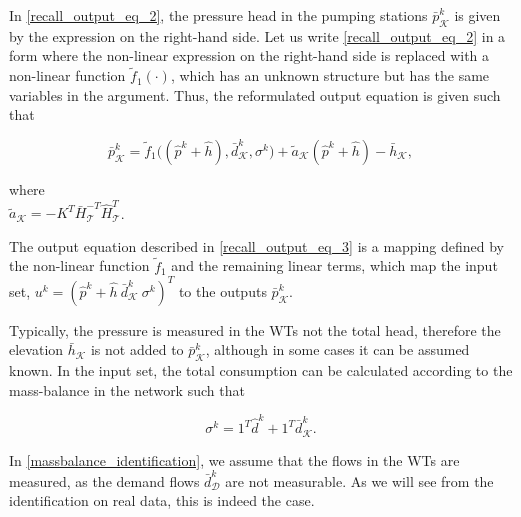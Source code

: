 \vspace{-4mm}
In \eqref{recall_output_eq_2}, the pressure head in the pumping stations $\bar{p}^{k}_{\mathcal{K}}$ is given by the expression on the right-hand side. Let us write \eqref{recall_output_eq_2} in a form where the non-linear expression on the right-hand side is replaced with a non-linear function $\tilde{f}_1(\cdot)$, which has an unknown structure but has the same variables in the argument. Thus, the reformulated output equation is given such that 

 \begin{equation}
  \label{recall_output_eq_3}
     \bar{p}^{k}_{\mathcal{K}}  = \tilde{f}_1 \big((\hat{p}^{k} + \hat{h}),\bar{d}^{k}_{\mathcal{K}}, \sigma^{k}\big) + \tilde{a}_{\mathcal{K}} (\hat{p}^{k} + \hat{h}) - \bar{h}_{\mathcal{K}}, 
\end{equation} 

\vspace{-1mm}

\begin{minipage}[t]{0.4\textwidth}
where\\
\hspace*{8mm} $\tilde{a}_{\mathcal{K}} = - K^T\bar{H}^{-T}_{\mathcal{T}}\hat{H}^{T}_{\mathcal{T}} $. 
\end{minipage}

The output equation described in \eqref{recall_output_eq_3} is a mapping defined by the non-linear function $\tilde{f}_1$ and the remaining linear terms, which map the input set, $u^{k} = ( \hat{p}^{k}\!+\!\hat{h} \ \bar{d}^{k}_{\mathcal{K}} \ \sigma^{k} )^T$ to the outputs $\bar{p}^{k}_{\mathcal{K}}$. 

Typically, the pressure is measured in the WTs not the total head, therefore the elevation $\bar{h}_{\mathcal{K}}$ is not added to $\bar{p}^{k}_{\mathcal{K}}$, although in some cases it can be assumed known. In the input set, the total consumption can be calculated according to the mass-balance in the network such that

\begin{equation}
\label{massbalance_identification}
 \sigma^{k} = 1^T \hat{d}^{k} + 1^T \bar{d}^{k}_{\mathcal{K}}.
\end{equation}

 In \eqref{massbalance_identification}, we assume that the flows in the WTs are measured, as the demand flows $\bar{d}^{k}_{\mathcal{D}} $ are not measurable. As we will see from the identification on real data, this is indeed the case. 

